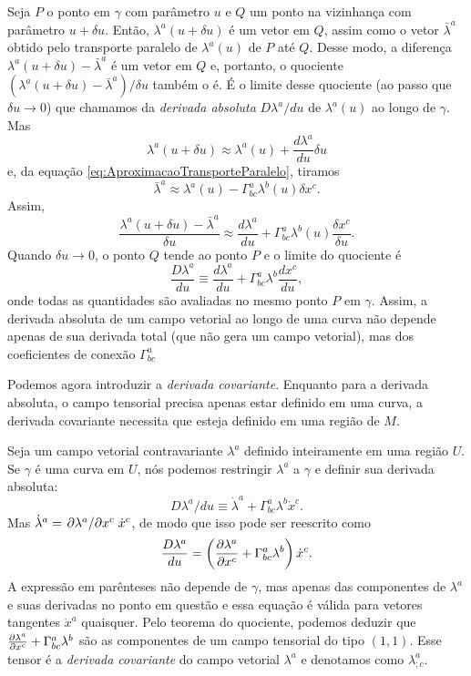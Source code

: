 Seja $ P $ o ponto em $ \gamma $ com parâmetro $ u $ e $ Q $ um ponto na vizinhança com parâmetro $ u+\delta u $. Então, $ \lambda^{a}(u+\delta u) $ é um vetor em $ Q $, assim como o vetor $ \bar{\lambda}^{a} $ obtido pelo transporte paralelo de $ \lambda^{a}(u) $ de $ P $ até $ Q$. Desse modo, a diferença $ \lambda^{a}(u+\delta u)-\bar{\lambda}^{a} $ é um vetor em $ Q $ e, portanto, o quociente $ \left(\lambda^{a}(u+\delta u)-\bar{\lambda}^{a}\right) / \delta u $ também o é. É o limite desse quociente (ao passo que $ \delta u \rightarrow 0 $) que chamamos da \textit{derivada absoluta} $ D \lambda^{a} / d u $ de $ \lambda^{a}(u) $ ao longo de $ \gamma $. Mas
\[
\lambda^{a}(u+\delta u) \approx \lambda^{a}(u)+\frac{d \lambda^{a}}{d u} \delta u
\]
e, da equação \eqref{eq:AproximacaoTransporteParalelo}, tiramos
\[
\bar{\lambda}^{a} \approx \lambda^{a}(u)-\Gamma_{b c}^{a} \lambda^{b}(u) \delta x^{c} .
\]
Assim,
\[
\frac{\lambda^{a}(u+\delta u)-\bar{\lambda}^{a}}{\delta u} \approx \frac{d \lambda^{a}}{d u}+\Gamma_{b c}^{a} \lambda^{b}(u) \frac{\delta x^{c}}{\delta u} .
\]
Quando $ \delta u \rightarrow 0 $, o ponto $ Q $ tende ao ponto $ P $ e o limite do quociente é 
\begin{equation}\label{eq:DerivadaAbsolutaDefinicao}
\boxed{
\frac{D \lambda^{a}}{d u} \equiv \frac{d \lambda^{a}}{d u}+\Gamma_{b c}^{a} \lambda^{b} \frac{d x^{c}}{d u} ,
}
\end{equation}
onde todas as quantidades são avaliadas no mesmo ponto $ P $ em $ \gamma $. Assim, a derivada absoluta de um campo vetorial ao longo de uma curva não depende apenas de sua derivada total (que não gera um campo vetorial), mas dos coeficientes de conexão $ \Gamma_{b c}^{a} $ 

Podemos agora introduzir a \textit{derivada covariante}. Enquanto para a derivada absoluta, o campo tensorial precisa apenas estar definido em uma curva, a derivada covariante necessita que esteja definido em uma região de $M$.

Seja um campo vetorial contravariante $\lambda^a$ definido inteiramente em uma região $U$. Se $\gamma$ é uma curva em $U$, nós podemos restringir $\lambda^a$ a $\gamma$ e definir sua derivada absoluta:
\[
	D\lambda^a/du \equiv \dot{\lambda}^a+\Gamma^a_{bc}\lambda^b\dot{x}^c.
\]
Mas $\dot{\lambda}^a=\pdv*{\lambda^a}{x^c}\dot{x}^c$, de modo que isso pode ser reescrito como
\[
	\frac{D\lambda^a}{du}=\left(\pdv{\lambda^a}{x^c}+\Gamma^a_{bc}\lambda^b \right) \dot{x}^c.
\]
A expressão em parênteses não depende de $\gamma$, mas apenas das componentes de $\lambda ^a $ e suas derivadas no ponto em questão e essa equação é válida para vetores tangentes $\dot{x}^a$ quaisquer. Pelo teorema do quociente, podemos deduzir que $\pdv{\lambda^a}{x^c}+\Gamma^a_{bc}\lambda^b$ são as componentes de um campo tensorial do tipo $(1,1)$. Esse tensor é a \textit{derivada covariante} do campo vetorial $\lambda^a$ e denotamos como $\lambda^a_{;c}$.

